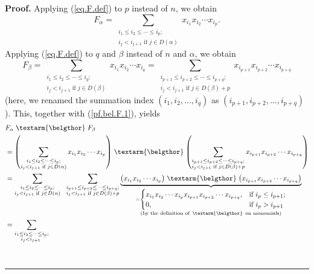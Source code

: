 \documentclass[numbers=enddot,12pt,final,onecolumn,notitlepage,abstracton]{scrartcl}%
\theoremstyle{definition}
\newenvironment{proof}[1][Proof]{\noindent\textbf{#1.} }{\ \rule{0.5em}{0.5em}}
\newcommand{\bel}{\left. \textarm{\belgthor} \right.}
\let\sumnonlimits\sum
\renewcommand{\sum}{\sumnonlimits\limits}
\begin{document}
\begin{proof}
Applying (\ref{eq.F.def}) to $p$ instead of $n$, we obtain%
\begin{equation}
F_{\alpha}=\sum_{\substack{i_{1}\leq i_{2}\leq\cdots\leq i_{p};\\i_{j}%
<i_{j+1}\text{ if }j\in D\left(  \alpha\right)  }}x_{i_{1}}x_{i_{2}}\cdots
x_{i_{p}}. \label{pf.bel.F.1}%
\end{equation}
Applying (\ref{eq.F.def}) to $q$ and $\beta$ instead of $n$ and $\alpha$, we
obtain%
\[
F_{\beta}=\sum_{\substack{i_{1}\leq i_{2}\leq\cdots\leq i_{q};\\i_{j}%
<i_{j+1}\text{ if }j\in D\left(  \beta\right)  }}x_{i_{1}}x_{i_{2}}\cdots
x_{i_{q}}=\sum_{\substack{i_{p+1}\leq i_{p+2}\leq\cdots\leq i_{p+q}%
;\\i_{j}<i_{j+1}\text{ if }j\in D\left(  \beta\right)  +p}}x_{i_{p+1}%
}x_{i_{p+2}}\cdots x_{i_{p+q}}%
\]
(here, we renamed the summation index $\left(  i_{1},i_{2},\ldots
,i_{q}\right)  $ as $\left(  i_{p+1},i_{p+2},\ldots,i_{p+q}\right)  $). This,
together with (\ref{pf.bel.F.1}), yields%
\begin{align}
&  F_{\alpha}\bel F_{\beta}\nonumber\\
&  =\left(  \sum_{\substack{i_{1}\leq i_{2}\leq\cdots\leq i_{p};\\i_{j}%
<i_{j+1}\text{ if }j\in D\left(  \alpha\right)  }}x_{i_{1}}x_{i_{2}}\cdots
x_{i_{p}}\right)  \bel\left(  \sum_{\substack{i_{p+1}\leq i_{p+2}\leq
\cdots\leq i_{p+q};\\i_{j}<i_{j+1}\text{ if }j\in D\left(  \beta\right)
+p}}x_{i_{p+1}}x_{i_{p+2}}\cdots x_{i_{p+q}}\right) \nonumber\\
&  =\sum_{\substack{i_{1}\leq i_{2}\leq\cdots\leq i_{p};\\i_{j}<i_{j+1}\text{
if }j\in D\left(  \alpha\right)  }}\ \ \sum_{\substack{i_{p+1}\leq i_{p+2}%
\leq\cdots\leq i_{p+q};\\i_{j}<i_{j+1}\text{ if }j\in D\left(  \beta\right)
+p}}\underbrace{\left(  x_{i_{1}}x_{i_{2}}\cdots x_{i_{p}}\right)  \bel\left(
x_{i_{p+1}}x_{i_{p+2}}\cdots x_{i_{p+q}}\right)  }_{\substack{=%
\begin{cases}
x_{i_{1}}x_{i_{2}}\cdots x_{i_{p}}x_{i_{p+1}}x_{i_{p+2}}\cdots x_{i_{p+q}}, &
\text{if }i_{p}\leq i_{p+1};\\
0, & \text{if }i_{p}>i_{p+1}%
\end{cases}
\\\text{(by the definition of }\bel\text{ on monomials)}}}\nonumber\\
&  =\sum_{\substack{i_{1}\leq i_{2}\leq\cdots\leq i_{p};\\i_{j}<i_{j+1}\text{
}}}
\end{align}
\end{proof}
\end{document}
